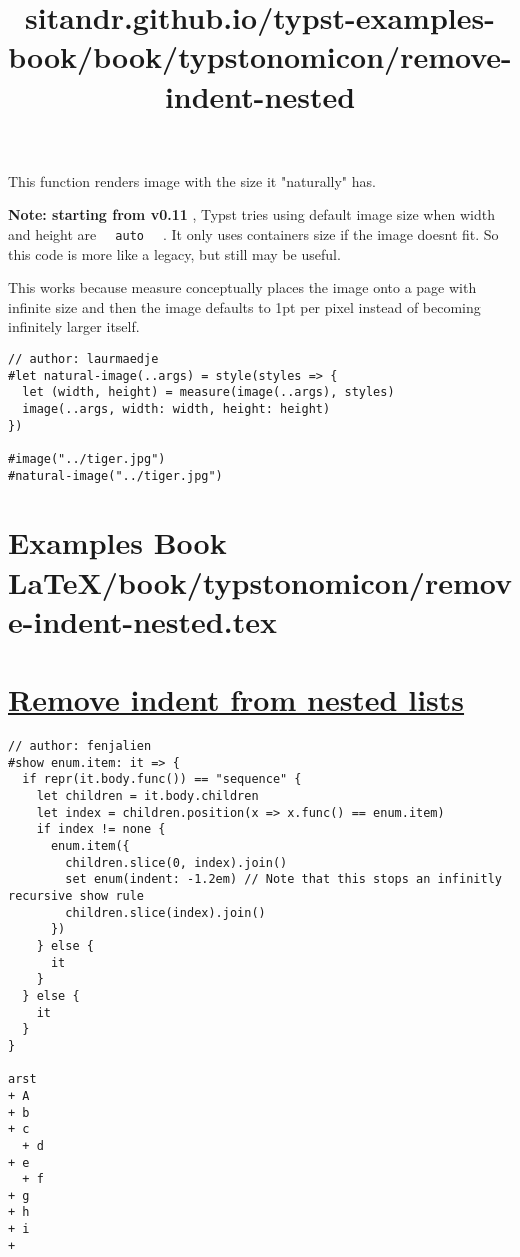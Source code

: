 This function renders image with the size it "naturally" has.

\textbf{Note: starting from v0.11} , Typst tries using default image
size when width and height are \texttt{\ }{\texttt{\ auto\ }}\texttt{\ }
. It only uses container\textquotesingle s size if the image
doesn\textquotesingle t fit. So this code is more like a legacy, but
still may be useful.

This works because measure conceptually places the image onto a page
with infinite size and then the image defaults to 1pt per pixel instead
of becoming infinitely larger itself.

\begin{verbatim}
// author: laurmaedje
#let natural-image(..args) = style(styles => {
  let (width, height) = measure(image(..args), styles)
  image(..args, width: width, height: height)
})

#image("../tiger.jpg")
#natural-image("../tiger.jpg")
\end{verbatim}

\pandocbounded{}


\section{Examples Book LaTeX/book/typstonomicon/remove-indent-nested.tex}
\title{sitandr.github.io/typst-examples-book/book/typstonomicon/remove-indent-nested}

\section{\texorpdfstring{\hyperref[remove-indent-from-nested-lists]{Remove
indent from nested
lists}}{Remove indent from nested lists}}\label{remove-indent-from-nested-lists}

\begin{verbatim}
// author: fenjalien
#show enum.item: it => {
  if repr(it.body.func()) == "sequence" {
    let children = it.body.children
    let index = children.position(x => x.func() == enum.item)
    if index != none {
      enum.item({
        children.slice(0, index).join()
        set enum(indent: -1.2em) // Note that this stops an infinitly recursive show rule
        children.slice(index).join()
      })
    } else {
      it
    }
  } else {
    it
  }
}

arst
+ A
+ b
+ c
  + d
+ e
  + f
+ g
+ h
+ i
+ 
\end{verbatim}

